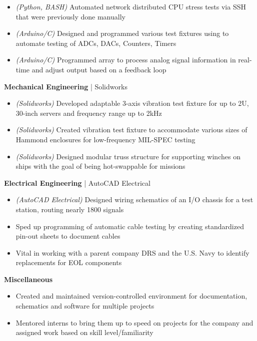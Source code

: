 \begin{cventries}
{\begin{cvitems}
{\begin{itemize}[noitemsep,wide=0pt, leftmargin=\dimexpr{} + 2\relax]
					\item[\textbullet]{\textit{(Python, BASH)} Automated network distributed CPU stress tests via SSH that were previously done manually}
					\item[\textbullet]{\textit{(Arduino/C)} Designed and programmed various test fixtures using to automate testing of ADCs, DACs, Counters, Timers}
					\item[\textbullet]{\textit{(Arduino/C)} Programmed array to process analog signal information in real-time and adjust output based on a feedback loop}
				\end{itemize}}
			\item {\textbf{Mechanical Engineering} | {\color{awesome}Solidworks}
				\begin{itemize}[noitemsep,wide=0pt, leftmargin=\dimexpr{} + 2\relax]
					\item[\textbullet]{\textit{(Solidworks)} Developed adaptable 3-axis vibration test fixture for up to 2U, 30-inch servers and frequency range up to 2kHz}
					\item[\textbullet]{\textit{(Solidworks)} Created vibration test fixture to accommodate various sizes of Hammond enclosures for low-frequency MIL-SPEC testing}
					\item[\textbullet]{\textit{(Solidworks)} Designed modular truss structure for supporting winches on ships with the goal of being hot-swappable for missions}
				\end{itemize}}
			\item {\textbf{Electrical Engineering} | {\color{awesome}AutoCAD Electrical}
				\begin{itemize}[noitemsep,wide=0pt, leftmargin=\dimexpr{} + 2\relax]
					\item[\textbullet]{\textit{(AutoCAD Electrical)} Designed wiring schematics of an I/O chassis for a test station, routing nearly 1800 signals}
					\item[\textbullet]{Sped up programming of automatic cable testing by creating standardized pin-out sheets to document cables}
					\item[\textbullet]{Vital in working with a parent company DRS and the U.S. Navy to identify replacements for EOL components}
				\end{itemize}}
			\item {\textbf{Miscellaneous}
				\begin{itemize}[noitemsep,wide=0pt, leftmargin=\dimexpr{} + 2\relax]
					\item[\textbullet]{Created and maintained version-controlled environment for documentation, schematics and software for multiple projects}
					\item[\textbullet]{Mentored interns to bring them up to speed on projects for the company and assigned work based on skill level/familiarity}
				\end{itemize}}
		\end{cvitems}
	}
\end{cventries}
